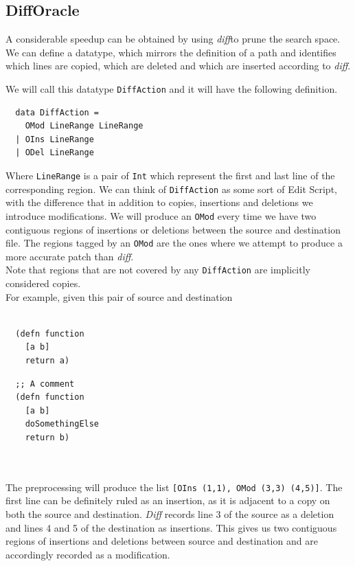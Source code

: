 \documentclass[11pt, titlepage]{article}
\newcommand{\toHaskell}[1]{\texttt{#1}\xspace}
\newcommand{\diff}{\emph{diff}}
\begin{document}
\subsection{DiffOracle}
A considerable speedup can be obtained by using \diff to prune the 
search space. We can define a datatype, which mirrors the definition of a path 
and identifies which lines are copied, which are deleted and which are inserted 
according to \diff.

We will call this datatype \texttt{DiffAction} and it will have the following 
definition.

\begin{verbatim}
  data DiffAction = 
    OMod LineRange LineRange
  | OIns LineRange
  | ODel LineRange  
\end{verbatim}

Where \toHaskell{LineRange} is a pair of \toHaskell{Int} which represent the first and last line of the corresponding region.
We can think of \toHaskell{DiffAction} as some sort of Edit Script, with the difference that in addition to copies, insertions and deletions we introduce modifications.
We will produce an \toHaskell{OMod} every time we have two contiguous regions of insertions or deletions between the source and destination file. The regions tagged by an \toHaskell{OMod} are the ones where we attempt to produce a more accurate patch than \diff. 
\\
Note that regions that are not covered by any \toHaskell{DiffAction} are implicitly considered copies.
\\
For example, given this pair of source and destination
\\
\\
\begin{minipage}[t]{0.5\textwidth}
\begin{verbatim}
  (defn function
    [a b]
    return a)
\end{verbatim}
\end{minipage}
\begin{minipage}[t]{0.4\textwidth}
\begin{verbatim}
  ;; A comment
  (defn function
    [a b]
    doSomethingElse
    return b)
\end{verbatim}
\end{minipage}
\\
\\
The preprocessing will produce the list \toHaskell{[OIns (1,1), OMod (3,3) (4,5)]}. The first line can be definitely ruled as an insertion, as it is adjacent to a copy on both the source and destination. \emph{Diff} records line 3 of the source as a deletion and lines 4 and 5 of the destination as insertions. This gives us two contiguous regions of insertions and deletions between source and destination and are accordingly recorded as a modification. 
\end{document}
